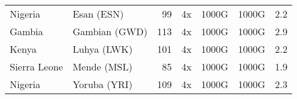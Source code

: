 \begin{table}[ht]
\begin{tabular}{llrrllr}
Nigeria & Esan (ESN) & 99 & 4x & 1000G & 1000G & 2.2 \\
Gambia & Gambian (GWD) & 113 & 4x & 1000G & 1000G & 2.9 \\
Kenya & Luhya (LWK) & 101 & 4x & 1000G & 1000G & 2.2 \\
Sierra Leone & Mende (MSL) & 85 & 4x & 1000G & 1000G & 1.9 \\
Nigeria & Yoruba (YRI) & 109 & 4x & 1000G & 1000G & 2.3 \\

\end{tabular}
\end{table}
